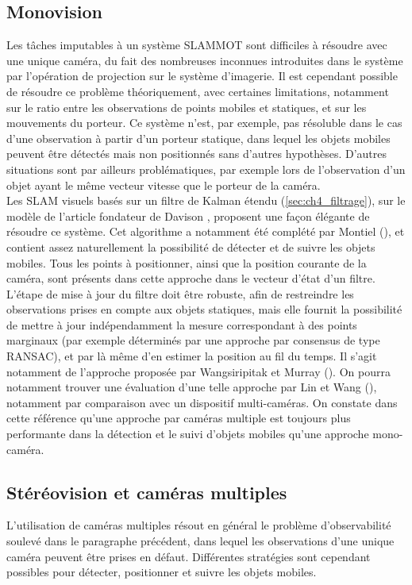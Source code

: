 \subsection{Monovision} \label{sec:ch2_SLAMMOT_mono}
Les tâches imputables à un système SLAMMOT sont difficiles à résoudre avec une unique caméra, du fait des nombreuses inconnues introduites dans le système par l'opération de projection sur le système d'imagerie. Il est cependant possible de résoudre ce problème théoriquement, avec certaines limitations, notamment sur le ratio entre les observations de points mobiles et statiques, et sur les mouvements du porteur. Ce système n'est, par exemple, pas résoluble dans le cas d'une observation à partir d'un porteur statique, dans lequel les objets mobiles peuvent être détectés mais non positionnés sans d'autres hypothèses. D'autres situations sont par ailleurs problématiques, par exemple lors de l'observation d'un objet ayant le même vecteur vitesse que le porteur de la caméra. \\

Les SLAM visuels basés sur un filtre de Kalman étendu (\ref{sec:ch4_filtrage}), sur le modèle de l'article fondateur de Davison \cite{Davison2003}, proposent une façon élégante de résoudre ce système. Cet algorithme a notamment été complété par Montiel (\cite{Montiel}), et contient assez naturellement la possibilité de détecter et de suivre les objets mobiles. Tous les points à positionner, ainsi que la position courante de la caméra, sont présents dans cette approche dans le vecteur d'état d'un filtre. L'étape de mise à jour du filtre doit être robuste, afin de restreindre les observations prises en compte aux objets statiques, mais elle fournit la possibilité de mettre à jour indépendamment la mesure correspondant à des points marginaux (par exemple déterminés par une approche par consensus de type RANSAC), et par là même d'en estimer la position au fil du temps. Il s'agit notamment de l'approche proposée par Wangsiripitak et Murray (\cite{Wangsiripitak2009}). On pourra notamment trouver une évaluation d'une telle approche par Lin et Wang (\cite{Lina}), notamment par comparaison avec un dispositif multi-caméras. On constate dans cette référence qu'une approche par caméras multiple est toujours plus performante dans la détection et le suivi d'objets mobiles qu'une approche mono-caméra.

\subsection{Stéréovision et caméras multiples}\label{sec:ch2_SLAMMOT_stereo}
L'utilisation de caméras multiples résout en général le problème d'observabilité soulevé dans le paragraphe précédent, dans lequel les observations d'une unique caméra peuvent être prises en défaut. Différentes stratégies sont cependant possibles pour détecter, positionner et suivre les objets mobiles. \\

